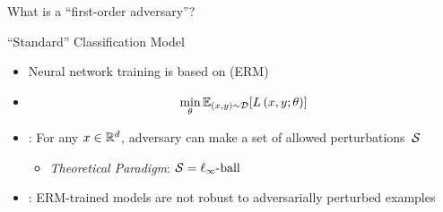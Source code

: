 
\begin{frame}{What is a ``first-order adversary''?}

\end{frame}

\begin{frame}{``Standard'' Classification Model}
  \begin{itemize}[<+->]
    \item Neural network training is based on \textit{} (ERM)
    \item \textbf{}
      \begin{equation}\label{eq:ERM}
        \min_{\theta} \mathbb{E}_{(x,y) \sim \mathcal{D}} \lbrack L \left( x, y ; \theta \right)\rbrack
      \end{equation}

    \item \textit{}: For any ${x \in \mathbb{R}^{d}}$, adversary can make a set of allowed perturbations~$\mathcal{S}$
      \begin{itemize}
        \item \textit{Theoretical Paradigm}: $\mathcal{S} = \ell_{\infty}\text{-ball}$
      \end{itemize}

    \item \textbf{}: ERM-trained models are not robust to adversarially perturbed examples~\cite{Biggio:2013,Szegedy:2013}
  \end{itemize}
\end{frame}

